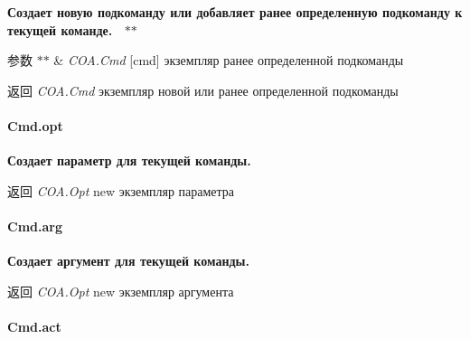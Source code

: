 {\bfseries  Создает новую подкоманду или добавляет ранее определенную подкоманду к текущей команде.~\newline
 $\ast$$\ast$
\begin{DoxyParams}{参数}
{\em $\ast$$\ast$} & {\itshape C\+O\+A.\+Cmd} {\ttfamily \mbox{[}cmd\mbox{]}} экземпляр ранее определенной подкоманды~\newline
 {\bfseries }\\
\hline
\end{DoxyParams}
\begin{DoxyReturn}{返回}
{\bfseries } {\itshape C\+O\+A.\+Cmd} экземпляр новой или ранее определенной подкоманды
\end{DoxyReturn}
\paragraph*{Cmd.\+opt}}

{\bfseries  Создает параметр для текущей команды.~\newline
 {\bfseries \begin{DoxyReturn}{返回}
{\itshape C\+O\+A.\+Opt} {\ttfamily new} экземпляр параметра
\end{DoxyReturn}
\paragraph*{Cmd.\+arg}}}

{\bfseries {\bfseries  Создает аргумент для текущей команды.~\newline
 {\bfseries \begin{DoxyReturn}{返回}
{\itshape C\+O\+A.\+Opt} {\ttfamily new} экземпляр аргумента
\end{DoxyReturn}
\paragraph*{Cmd.\+act}}}}

